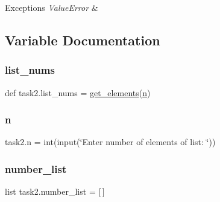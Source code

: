 \begin{DoxyExceptions}{Exceptions}
{\em Value\+Error} & \\
\hline
\end{DoxyExceptions}


\subsection{Variable Documentation}
\mbox{\label{namespacetask2_ab347180da4f986287b292509879abce8}} 
\subsubsection{\texorpdfstring{list\+\_\+nums}{list\_nums}}
{\footnotesize\ttfamily def task2.\+list\+\_\+nums = \hyperlink{namespacetask2_a432a279dd14fb6454f57f0bbe95a1360}{get\+\_\+elements}(\hyperlink{namespacetask2_a639bf5c5a83c25a0c5f798a271b6d57a}{n})}

\mbox{\label{namespacetask2_a639bf5c5a83c25a0c5f798a271b6d57a}} 
\subsubsection{\texorpdfstring{n}{n}}
{\footnotesize\ttfamily task2.\+n = int(input(\char`\"{}Enter number of elements of list\+: \char`\"{}))}

\mbox{\label{namespacetask2_aa8667dc535028ca44d37a774a5be3c8a}} 
\subsubsection{\texorpdfstring{number\+\_\+list}{number\_list}}
{\footnotesize\ttfamily list task2.\+number\+\_\+list = \mbox{[}$\,$\mbox{]}}

